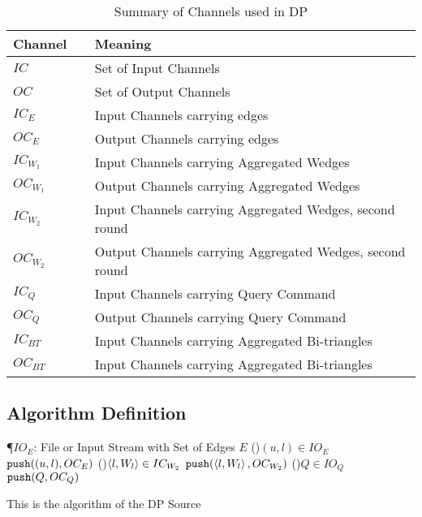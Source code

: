 %      
\begin{table}[ht]
\centering
\begin{tabular}{|p{0.2\linewidth}|p{0.8\linewidth}|} \hline
\textbf{Channel} & \textbf{Meaning}\\ \hline
$IC$ & Set of Input Channels \\ \hline
$OC$ & Set of Output Channels \\ \hline
$IC_E$ & Input Channels carrying edges \\ \hline
$OC_E$ & Output Channels carrying edges \\ \hline
$IC_{W_1}$ & Input Channels carrying Aggregated Wedges \\ \hline
$OC_{W_1}$ & Output Channels carrying Aggregated Wedges \\ \hline
$IC_{W_2}$ & Input Channels carrying Aggregated Wedges, second round \\ \hline
$OC_{W_2}$ & Output Channels carrying Aggregated Wedges, second round \\ \hline
$IC_Q$ & Input Channels carrying Query Command \\ \hline
$OC_Q$ & Output Channels carrying Query Command \\ \hline
$IC_{BT}$ & Input Channels carrying Aggregated Bi-triangles \\ \hline
$OC_{BT}$ & Input Channels carrying Aggregated Bi-triangles \\ \hline
\end{tabular}
\caption{Summary of Channels used in DP}
\label{table:channels}
\end{table}
%
%      
      
\subsection{Algorithm Definition}
\begin{algorithm}
\P{$IO_E$: File or Input Stream with Set of Edges $E$}
\ForAll(){$(u,l) \in IO_E$}
{$\mathtt{push}((u,l), OC_E)$
}
\ForAll(){$\left\langle l, W_l \right\rangle \in IC_{W_2}$}
{$\mathtt{push}(\left\langle l, W_l \right\rangle, OC_{W_2})$
}
\ForAll(){$Q \in IO_Q$}
{$\mathtt{push}(Q, OC_Q)$
}
\caption{This is the algorithm of the DP Source}
\end{algorithm}

